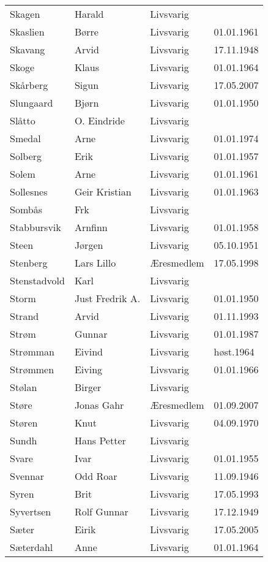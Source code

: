 \documentclass[fsbok.tex]{subfiles}
\begin{document}
\begin{longtable}{llll}
Skagen	&	Harald	&	Livsvarig 	&		\\
Skaslien	&	Børre	&	Livsvarig 	&	01.01.1961	\\
Skavang	&	Arvid	&	Livsvarig 	&	17.11.1948	\\
Skoge	&	Klaus	&	Livsvarig 	&	01.01.1964	\\
Skårberg	&	Sigun	&	Livsvarig	&	17.05.2007	\\
Slungaard	&	Bjørn	&	Livsvarig 	&	01.01.1950	\\
Slåtto	&	O. Eindride	&	Livsvarig 	&		\\
Smedal	&	Arne	&	Livsvarig 	&	01.01.1974	\\
Solberg	&	Erik	&	Livsvarig 	&	01.01.1957	\\
Solem	&	Arne	&	Livsvarig 	&	01.01.1961	\\
Sollesnes	&	Geir Kristian	&	Livsvarig 	&	01.01.1963	\\
Sombås	&	Frk	&	Livsvarig 	&		\\
Stabbursvik	&	Arnfinn	&	Livsvarig 	&	01.01.1958	\\
Steen	&	Jørgen	&	Livsvarig 	&	05.10.1951	\\
Stenberg 	&	Lars Lillo 	&	Æresmedlem	&	17.05.1998	\\
Stenstadvold	&	Karl	&	Livsvarig 	&		\\
Storm	&	Just Fredrik A.	&	Livsvarig 	&	01.01.1950	\\
Strand	&	Arvid	&	Livsvarig 	&	01.11.1993	\\
Strøm	&	Gunnar	&	Livsvarig 	&	01.01.1987	\\
Strømman	&	Eivind	&	Livsvarig 	&	høst.1964	\\
Strømmen	&	Eiving	&	Livsvarig 	&	01.01.1966	\\
Stølan	&	Birger	&	Livsvarig 	&		\\
Støre	&	Jonas Gahr	&	Æresmedlem	&	01.09.2007	\\
Støren	&	Knut	&	Livsvarig 	&	04.09.1970	\\
Sundh	&	Hans Petter	&	Livsvarig 	&		\\
Svare	&	Ivar	&	Livsvarig 	&	01.01.1955	\\
Svennar	&	Odd Roar	&	Livsvarig 	&	11.09.1946	\\
Syren	&	Brit	&	Livsvarig 	&	17.05.1993	\\
Syvertsen	&	Rolf Gunnar	&	Livsvarig 	&	17.12.1949	\\
Sæter 	&	Eirik	&	Livsvarig	&	17.05.2005	\\
Sæterdahl	&	Anne	&	Livsvarig 	&	01.01.1964	\\

\end{longtable}
\end{document}

